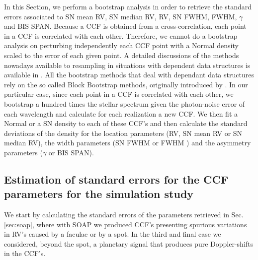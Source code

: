 \documentclass{aa}
\begin{document}
In this Section, we perform a bootstrap analysis \citep[e.g.][]{davison1997bootstrap, efron1994introduction} in order to retrieve the standard errors associated to SN mean RV, SN median RV, RV, SN FWHM, FWHM, $\gamma$ and BIS SPAN. Because a CCF is obtained from a cross-correlation, each point in a CCF is correlated with each other. Therefore, we cannot do a bootstrap analysis on perturbing independently each CCF point with a Normal density scaled to the error of each given point. A detailed discussions of the methods nowadays available to resampling in situations with dependent data structures is available in \citet{lahiri2013resampling}. All the bootstrap methods that deal with dependant data structures rely on the so called Block Bootstrap methods, originally introduced by \citet{wilks1997resampling}. In our particular case, since each point in a CCF is correlated with each other, we bootstrap a hundred times the stellar spectrum given the photon-noise error of each wavelength and calculate for each realization a new CCF. We then fit a Normal or a SN density to each of these CCF's and then calculate the standard deviations of the density for the location parameters (RV, SN mean RV or SN median RV), the width parameters (SN FWHM or FWHM ) and the asymmetry parameters ($\gamma$ or BIS SPAN).

\subsection{Estimation of standard errors for the CCF parameters for the simulation study} \label{sec:bootstrap_soap}

We start by calculating the standard errors of the parameters retrieved in Sec. \ref{sec:soap}, where with SOAP we produced CCF's presenting spurious variations in RV's caused by a faculae or by a spot. In the third and final case we considered, beyond the spot, a planetary signal that produces pure Doppler-shifts in the CCF's.
\end{document}
